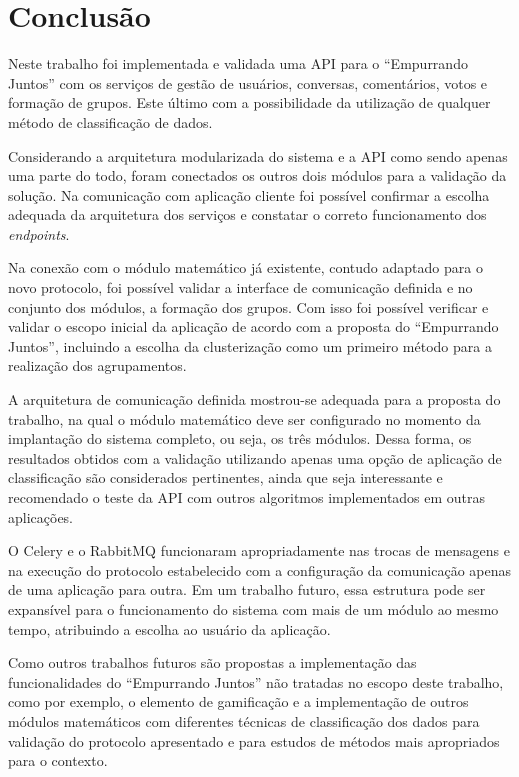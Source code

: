 \chapter{Conclusão} \label{cap:consideracoes_finais}

  Neste trabalho foi implementada e validada uma API para o ``Empurrando Juntos'' com os serviços de gestão de usuários, 
  conversas, comentários, votos e formação de grupos. Este último com a possibilidade da utilização de qualquer método de classificação 
  de dados.
  
  Considerando a arquitetura modularizada do sistema e a API como sendo apenas uma parte do todo, 
  foram conectados os outros dois módulos para a validação 
  da solução. Na comunicação com aplicação cliente foi possível confirmar a escolha adequada da arquitetura dos serviços e 
  constatar o correto funcionamento dos \textit{endpoints}.
  
  Na conexão com o módulo matemático já existente, contudo adaptado para o novo protocolo, foi possível validar a interface de 
  comunicação definida e no conjunto dos módulos, a formação dos grupos. Com isso foi possível verificar e validar o escopo 
  inicial da aplicação de acordo com a proposta do ``Empurrando Juntos'', incluindo a escolha da clusterização 
  como um primeiro método para a realização dos agrupamentos. 
  
  A arquitetura de comunicação definida mostrou-se adequada para a proposta do trabalho, na qual o módulo matemático 
  deve ser configurado no momento da implantação do sistema completo, ou seja, os três módulos. Dessa forma, os resultados obtidos
  com a validação utilizando apenas uma opção de aplicação de classificação são considerados pertinentes, ainda que seja interessante e recomendado
  o teste da API com outros algoritmos implementados em outras aplicações.
  
  O Celery e o RabbitMQ funcionaram apropriadamente nas trocas de mensagens e na execução do protocolo estabelecido com a configuração
  da comunicação apenas de uma aplicação para outra. Em um trabalho futuro, essa estrutura pode ser expansível para o funcionamento do sistema com mais 
  de um módulo ao mesmo tempo, atribuindo a escolha ao usuário da aplicação.
  
  Como outros trabalhos futuros são propostas a implementação das funcionalidades do ``Empurrando Juntos'' não tratadas no escopo deste trabalho,
  como por exemplo, o elemento de gamificação e a implementação de outros módulos matemáticos com diferentes técnicas
  de classificação dos dados para validação do protocolo apresentado e para estudos de métodos mais apropriados para o contexto.
  
